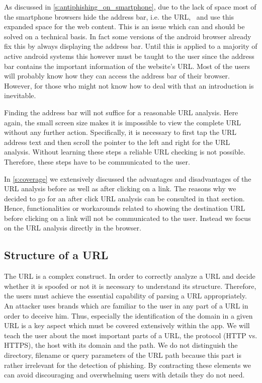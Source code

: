 \begin{description}[leftmargin=0cm]
	\item[Invisible Address Bar:] As discussed in \autoref{s:antiphishing_on_smartphone}, due to the lack of space most of the smartphone browsers hide the address bar, i.e. the URL,~\cite{amrutkar2012measuring} and use this expanded space for the web content. This is an issue which can and should be solved on a technical basis. In fact some versions of the android browser already fix this by always displaying the address bar. Until this is applied to a majority of active android systems this however must be taught to the user since the address bar contains the important information of the website's URL.
Most of the users will probably know how they can access the address bar of their browser.
However, for those who might not know how to deal with that an introduction is inevitable.

	\item[Analyze Complete URL Via Address Bar:] Finding the address bar will not suffice for a reasonable URL analysis. 
Here again, the small screen size makes it is impossible to view the complete URL without any further action.
Specifically, it is necessary to first tap the URL address text and then scroll the pointer to the left and right for the URL analysis.
Without learning these steps a reliable URL checking is not possible. 
Therefore, these steps have to be communicated to the user.

	\item[Analyze URL After Click:] In \autoref{s:coverage} we extensively discussed the advantages and disadvantages of the URL analysis before as well as after clicking on a link.
The reasons why we decided to go for an after click URL analysis can be consulted in that section.
Hence, functionalities or workarounds related to showing the destination URL before clicking on a link will not be communicated to the user.
Instead we focus on the URL analysis directly in the browser.
\end{description}

\subsection{Structure of a URL}
\label{s:url_structure}
The URL is a complex construct. 
In order to correctly analyze a URL and decide whether it is spoofed or not it is necessary to understand its structure. 
Therefore, the users must achieve the essential capability of parsing a URL appropriately.
An attacker uses brands which are familiar to the user in any part of a URL in order to deceive him. 
Thus, especially the identification of the domain in a given URL is a key aspect which must be covered extensively within the app. 
We will teach the user about the most important parts of a URL, the protocol (HTTP vs. HTTPS), the host with its domain and the path.
We do not distinguish the directory, filename or query parameters of the URL path because this part is rather irrelevant for the detection of phishing.
By contracting these elements we can avoid discouraging and overwhelming users with details they do not need.

